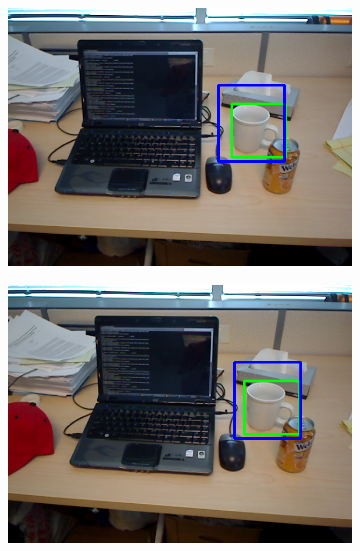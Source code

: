 \begin{figure}
	\centering
	\begin{subfigure}[b]{0.3\textwidth}
		\includegraphics[width=\textwidth]{img/seguimiento_solo_frame/solo_frame-desk_1-coffee_mug_5-frame_26.png}
	\end{subfigure}
	\begin{subfigure}[b]{0.3\textwidth}
		\includegraphics[width=\textwidth]{img/seguimiento_solo_frame/solo_frame-desk_1-coffee_mug_5-frame_27.png}
	\end{subfigure}
	\begin{subfigure}[b]{0.3\textwidth}

\end{subfigure}
\end{figure}
